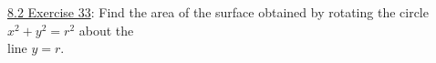 \documentclass[paper=a4, fontsize=11pt]{scrartcl} %
\numberwithin{equation}{section} %
\numberwithin{figure}{section} %
\numberwithin{table}{section} %
\begin{document}
\vspace{3.5in}

\underline{8.2 Exercise 33}: Find the area of the surface obtained by rotating the circle $x^2 + y^2 = r^2$ about the \\
\hspace{1.15in} line $y=r$.\\
\indent



















\end{document}
